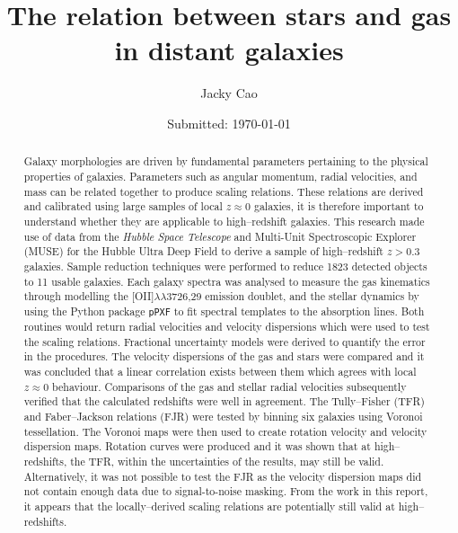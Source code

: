 \documentclass[12pt, twocolumn, nofootinbib]{revtex4-1}    %
\begin{document}
                     

\begin{titlepage}
\title{The relation between stars and gas in distant galaxies} 
\date{Submitted: \today{}}
\author{Jacky Cao}

\begin{abstract}  
Galaxy morphologies are driven by fundamental parameters pertaining to the physical properties of galaxies. Parameters such as angular momentum, radial velocities, and mass can be related together to produce scaling relations. These relations are derived and calibrated using large samples of local $z\approx0$ galaxies, it is therefore important to understand whether they are applicable to high--redshift galaxies. This research made use of data from the \textit{Hubble Space Telescope} and Multi-Unit Spectroscopic Explorer (MUSE) for the Hubble Ultra Deep Field to derive a sample of high--redshift $z>0.3$ galaxies. Sample reduction techniques were performed to reduce 1823 detected objects to 11 usable galaxies. Each galaxy spectra was analysed to measure the gas kinematics through modelling the [OII]$\lambda\lambda$3726,29 emission doublet, and the stellar dynamics by using the Python package \texttt{pPXF} to fit spectral templates to the absorption lines. Both routines would return radial velocities and velocity dispersions which were used to test the scaling relations. Fractional uncertainty models were derived to quantify the error in the procedures. The velocity dispersions of the gas and stars were compared and it was concluded that a linear correlation exists between them which agrees with local $z\approx0$ behaviour. Comparisons of the gas and stellar radial velocities subsequently verified that the calculated redshifts were well in agreement. The Tully--Fisher (TFR) and Faber--Jackson relations (FJR) were tested by binning six galaxies using Voronoi tessellation. The Voronoi maps were then used to create rotation velocity and velocity dispersion maps. Rotation curves were produced and it was shown that at high--redshifts, the TFR, within the uncertainties of the results, may still be valid. Alternatively, it was not possible to test the FJR as the velocity dispersion maps did not contain enough data due to signal-to-noise masking. From the work in this report, it appears that the locally--derived scaling relations are potentially still valid at high--redshifts.
\end{abstract}


\end{titlepage}
\end{document}
